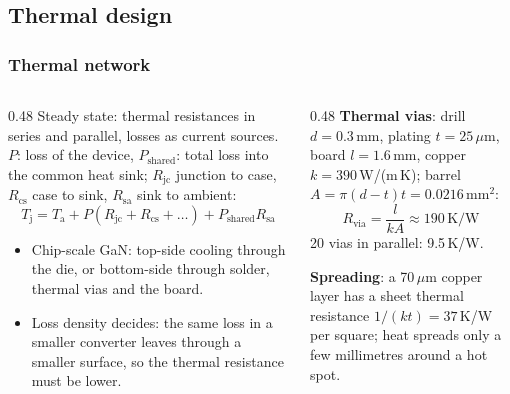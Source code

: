 \subsection{Thermal design}

\begin{frame}
	\frametitle{Thermal network}
	\begin{columns}[T]
		\begin{column}{0.48\textwidth}
			\footnotesize
			Steady state: thermal resistances in series and parallel, losses as current sources. $P$: loss of the device, $P_\mathrm{shared}$: total loss into the common heat sink; $R_\mathrm{jc}$ junction to case, $R_\mathrm{cs}$ case to sink, $R_\mathrm{sa}$ sink to ambient:
			\begin{equation*}
				T_\mathrm{j}=T_\mathrm{a}+P\left(R_\mathrm{jc}+R_\mathrm{cs}+\ldots\right)+P_\mathrm{shared}R_\mathrm{sa}
			\end{equation*}
			\begin{itemize}
				\item Chip-scale GaN: top-side cooling through the die, or bottom-side through solder, thermal vias and the board.
				\item Loss density decides: the same loss in a smaller converter leaves through a smaller surface, so the thermal resistance must be lower.
			\end{itemize}
		\end{column}
		\begin{column}{0.48\textwidth}
			\footnotesize
			\textbf{Thermal vias}: drill $d=0.3$\,mm, plating $t=25\,\mu$m, board $l=1.6$\,mm, copper $k=390$\,W/(m\,K); barrel $A=\pi(d-t)t=0.0216\,\mathrm{mm^2}$:
			\begin{equation*}
				R_\mathrm{via}=\frac{l}{kA}\approx190\,\mathrm{K/W}
			\end{equation*}
			20 vias in parallel: 9.5\,K/W.
			\vspace{0.2cm}

			\textbf{Spreading}: a 70\,$\mu$m copper layer has a sheet thermal resistance $1/(kt)=37$\,K/W per square; heat spreads only a few millimetres around a hot spot.
		\end{column}
	\end{columns}
\end{frame}

